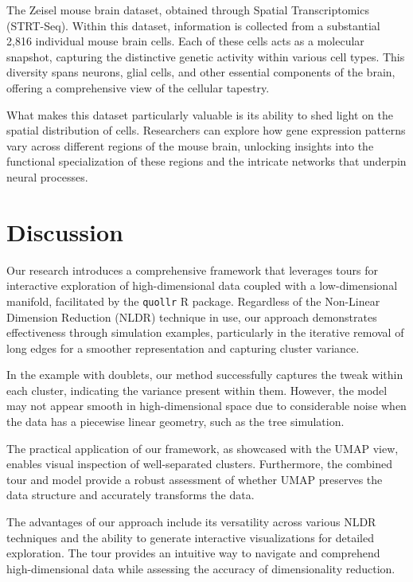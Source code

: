 \documentclass[
  12pt]{article}
\begin{document}
The Zeisel mouse brain dataset, obtained through Spatial Transcriptomics
(STRT-Seq). Within this dataset, information is collected from a
substantial 2,816 individual mouse brain cells. Each of these cells acts
as a molecular snapshot, capturing the distinctive genetic activity
within various cell types. This diversity spans neurons, glial cells,
and other essential components of the brain, offering a comprehensive
view of the cellular tapestry.

What makes this dataset particularly valuable is its ability to shed
light on the spatial distribution of cells. Researchers can explore how
gene expression patterns vary across different regions of the mouse
brain, unlocking insights into the functional specialization of these
regions and the intricate networks that underpin neural processes.

\hypertarget{sec-discussion}{%
\section{Discussion}\label{sec-discussion}}

Our research introduces a comprehensive framework that leverages tours
for interactive exploration of high-dimensional data coupled with a
low-dimensional manifold, facilitated by the \texttt{quollr} R package.
Regardless of the Non-Linear Dimension Reduction (NLDR) technique in
use, our approach demonstrates effectiveness through simulation
examples, particularly in the iterative removal of long edges for a
smoother representation and capturing cluster variance.

In the example with doublets, our method successfully captures the tweak
within each cluster, indicating the variance present within them.
However, the model may not appear smooth in high-dimensional space due
to considerable noise when the data has a piecewise linear geometry,
such as the tree simulation.

The practical application of our framework, as showcased with the UMAP
view, enables visual inspection of well-separated clusters. Furthermore,
the combined tour and model provide a robust assessment of whether UMAP
preserves the data structure and accurately transforms the data.

The advantages of our approach include its versatility across various
NLDR techniques and the ability to generate interactive visualizations
for detailed exploration. The tour provides an intuitive way to navigate
and comprehend high-dimensional data while assessing the accuracy of
dimensionality reduction.
\end{document}
